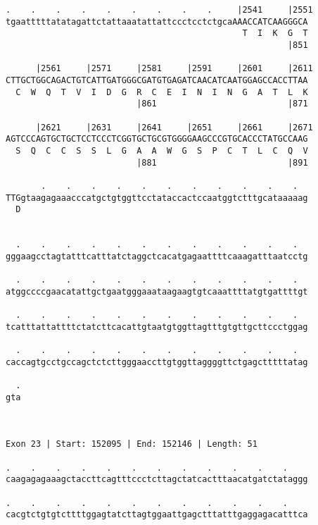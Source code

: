 \documentclass{article}
\begin{document}
\begin{Verbatim}
.    .    .    .    .    .    .    .    .     |2541     |2551
tgaatttttatatagattctattaaatattattccctcctctgcaAAACCATCAAGGGCA
                                               T  I  K  G  T
                                                        |851
  
      |2561     |2571     |2581     |2591     |2601     |2611
CTTGCTGGCAGACTGTCATTGATGGGCGATGTGAGATCAACATCAATGGAGCCACCTTAA
  C  W  Q  T  V  I  D  G  R  C  E  I  N  I  N  G  A  T  L  K
                          |861                          |871
  
      |2621     |2631     |2641     |2651     |2661     |2671
AGTCCCAGTGCTGCTCCTCCCTCGGTGCTGCGTGGGGAAGCCCGTGCACCCTATGCCAAG
  S  Q  C  C  S  S  L  G  A  A  W  G  S  P  C  T  L  C  Q  V
                          |881                          |891
  
       .    .    .    .    .    .    .    .    .    .    .  
TTGgtaagagaaacccatgctgtggttcctataccactccaatggtctttgcataaaaag
  D                                                         
                                                            
  
  .    .    .    .    .    .    .    .    .    .    .    .  
gggaagcctagtatttcatttatctaggctcacatgagaattttcaaagatttaatcctg
                                                            
  .    .    .    .    .    .    .    .    .    .    .    .  
atggccccgaacatattgctgaatgggaaataagaagtgtcaaattttatgtgattttgt
                                                            
  .    .    .    .    .    .    .    .    .    .    .    .  
tcatttattattttctatcttcacattgtaatgtggttagtttgtgttgcttccctggag
                                                            
  .    .    .    .    .    .    .    .    .    .    .    .  
caccagtgcctgccagctctcttgggaaccttgtggttaggggttctgagctttttatag
                                                            
  .
gta
   
   
 
Exon 23 | Start: 152095 | End: 152146 | Length: 51
 
.    .    .    .    .    .    .    .    .    .    .    .    
caagagagaaagctaccttcagtttccctcttagctatcactttaacatgatctataggg
                                                            
.    .    .    .    .    .    .    .    .    .    .    .    
cacgtctgtgtcttttggagtatcttagtggaattgagctttatttgaggagacatttca
                                                            

\end{Verbatim}
\end{document}
